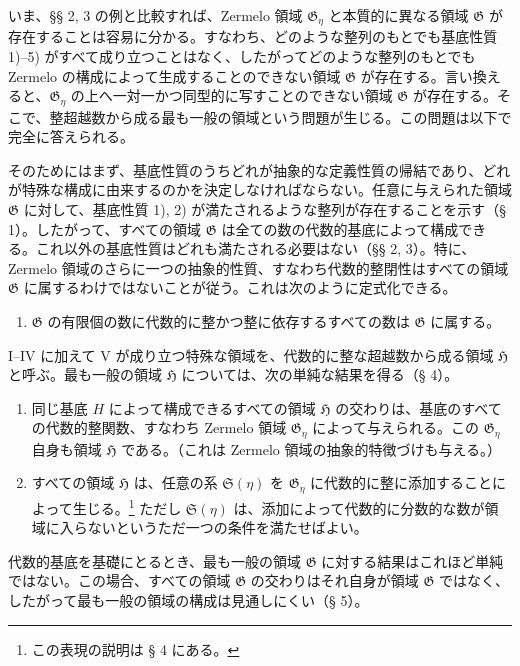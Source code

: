 \documentclass[11pt]{article}
\begin{document}
いま、§§ 2, 3 の例と比較すれば、Zermelo 領域 $\mathfrak G_\eta$ と本質的に異なる領域 $\mathfrak G$ が存在することは容易に分かる。すなわち、どのような整列のもとでも基底性質 1)--5) がすべて成り立つことはなく、したがってどのような整列のもとでも Zermelo の構成によって生成することのできない領域 $\mathfrak G$ が存在する。言い換えると、$\mathfrak G_\eta$ の上へ一対一かつ同型的に写すことのできない領域 $\mathfrak G$ が存在する。そこで、整超越数から成る最も一般の領域という問題が生じる。この問題は以下で完全に答えられる。

そのためにはまず、基底性質のうちどれが抽象的な定義性質の帰結であり、どれが特殊な構成に由来するのかを決定しなければならない。任意に与えられた領域 $\mathfrak G$ に対して、基底性質 1), 2) が満たされるような整列が存在することを示す（§ 1）。したがって、すべての領域 $\mathfrak G$ は全ての数の代数的基底によって構成できる。これ以外の基底性質はどれも満たされる必要はない（§§ 2, 3）。特に、Zermelo 領域のさらに一つの抽象的性質、すなわち代数的整閉性はすべての領域 $\mathfrak G$ に属するわけではないことが従う。これは次のように定式化できる。
\begin{enumerate}
\item[V.] $\mathfrak G$ の有限個の数に代数的に整かつ整に依存するすべての数は $\mathfrak G$ に属する。
\end{enumerate}

I--IV に加えて V が成り立つ特殊な領域を、代数的に整な超越数から成る領域 $\mathfrak H$ と呼ぶ。最も一般の領域 $\mathfrak H$ については、次の単純な結果を得る（§ 4）。
\begin{enumerate}
\item[a)] 同じ基底 $H$ によって構成できるすべての領域 $\mathfrak H$ の交わりは、基底のすべての代数的整関数、すなわち Zermelo 領域 $\mathfrak G_\eta$ によって与えられる。この $\mathfrak G_\eta$ 自身も領域 $\mathfrak H$ である。（これは Zermelo 領域の抽象的特徴づけも与える。）
\item[b)] すべての領域 $\mathfrak H$ は、任意の系 $\mathfrak S(\eta)$ を $\mathfrak G_\eta$ に代数的に整に添加することによって生じる。\footnote{この表現の説明は § 4 にある。} ただし $\mathfrak S(\eta)$ は、添加によって代数的に分数的な数が領域に入らないというただ一つの条件を満たせばよい。
\end{enumerate}

代数的基底を基礎にとるとき、最も一般の領域 $\mathfrak G$ に対する結果はこれほど単純ではない。この場合、すべての領域 $\mathfrak G$ の交わりはそれ自身が領域 $\mathfrak G$ ではなく、したがって最も一般の領域の構成は見通しにくい（§ 5）。
\end{document}
